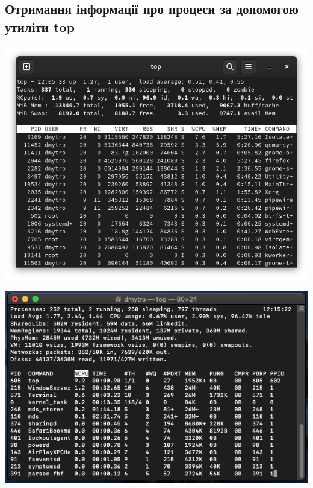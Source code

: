 \documentclass{article}
\begin{document}
\begin{normalsize}
	\section*{Отримання інформації про процеси за допомогою утиліти top}
	\begin{center}
		\includegraphics[scale=0.5]{top1}
	\end{center}
	\begin{center}
		\includegraphics[scale=0.5]{top2}
	\end{center}

\end{normalsize}
\end{document}
